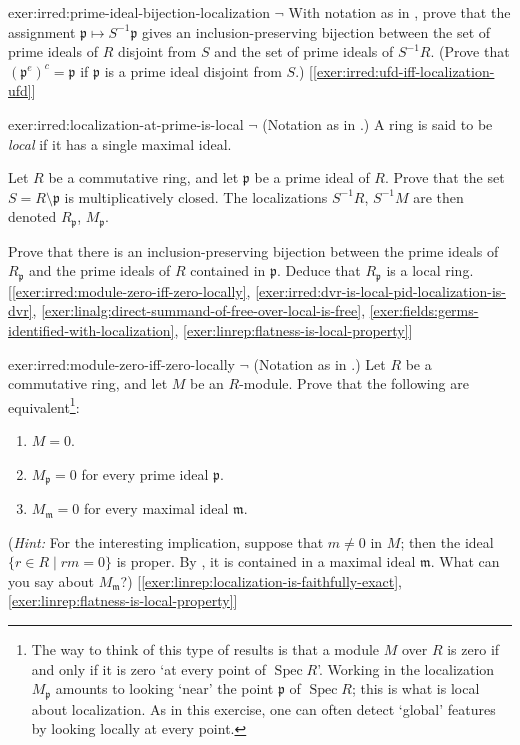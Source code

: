 \begin{exer}{}{exer:irred:prime-ideal-bijection-localization}
  $\lnot$ With notation as in
  , prove
  that the assignment $\mathfrak{p} \mapsto S^{-1}\mathfrak{p}$ gives
  an inclusion-preserving bijection between the set of prime ideals of
  $R$ disjoint from $S$ and the set of prime ideals of
  $S^{-1}R$. (Prove that $(\mathfrak{p}^e)^c = \mathfrak{p}$ if
  $\mathfrak{p}$ is a prime ideal disjoint from $S$.)
  [\ref{exer:irred:ufd-iff-localization-ufd}]
\end{exer}
\begin{exer}{}{exer:irred:localization-at-prime-is-local}
  $\lnot$ (Notation as in
  .)
  A ring is said to be
  \emph{local} if it has a single maximal ideal.

  Let $R$ be a commutative ring, and let $\mathfrak{p}$ be a prime
  ideal of $R$. Prove that the set $S = R \setminus \mathfrak{p}$ is
  multiplicatively closed. The localizations $S^{-1}R$, $S^{-1}M$ are
  then denoted $R_{\mathfrak{p}}$, $M_{\mathfrak{p}}$.

  Prove that there is an inclusion-preserving bijection between the
  prime ideals of $R_{\mathfrak{p}}$ and the prime ideals of $R$
  contained in $\mathfrak{p}$. Deduce that $R_{\mathfrak{p}}$ is a
  local ring.  [\ref{exer:irred:module-zero-iff-zero-locally},
  \ref{exer:irred:dvr-is-local-pid-localization-is-dvr},
  \ref{exer:linalg:direct-summand-of-free-over-local-is-free},
  \ref{exer:fields:germs-identified-with-localization},
  \ref{exer:linrep:flatness-is-local-property}]
\end{exer}
\begin{exer}{}{exer:irred:module-zero-iff-zero-locally}
  $\lnot$ (Notation as in
  .) Let $R$ be a
  commutative ring, and let $M$ be an $R$-module. Prove that the
  following are equivalent\footnote{The way to think of this type of
    results is that a module $M$ over $R$ is zero if and only if it is
    zero `at every point of $\operatorname{Spec} R$'. Working in the
    localization $M_{\mathfrak{p}}$ amounts to looking `near' the
    point $\mathfrak{p}$ of $\operatorname{Spec} R$; this is what is
    local about localization. As in this exercise, one can often
    detect `global' features by looking locally at every point.}:
  \begin{enumerate}[label=(\arabic*)]
  \item $M = 0$.
  \item $M_{\mathfrak{p}} = 0$ for every prime ideal $\mathfrak{p}$.
  \item $M_{\mathfrak{m}} = 0$ for every maximal ideal $\mathfrak{m}$.
  \end{enumerate}
  (\emph{Hint:} For the interesting implication, suppose that
  $m \neq 0$ in $M$; then the ideal $\{r \in R \mid rm = 0\}$ is
  proper. By , it is contained in a maximal ideal
  $\mathfrak{m}$.  What can you say about $M_{\mathfrak{m}}$?)
  [\ref{exer:linrep:localization-is-faithfully-exact},
  \ref{exer:linrep:flatness-is-local-property}]
\end{exer}
